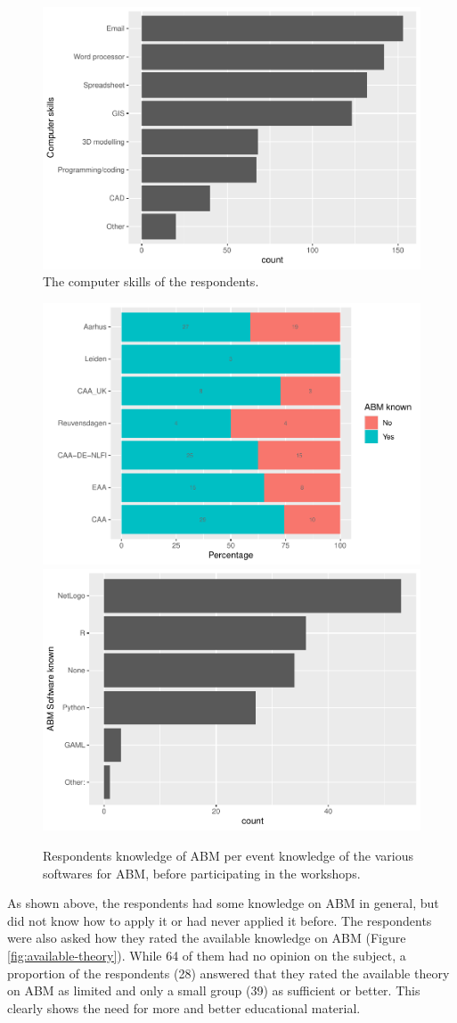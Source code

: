 \documentclass[
]{article}
\begin{document}
\begin{figure}
\includegraphics[width=0.5\linewidth]{paper_files/figure-latex/computer-skills-1} \caption{The computer skills of the respondents.}\label{fig:computer-skills}
\end{figure}

\begin{figure}
\includegraphics[width=0.5\linewidth]{paper_files/figure-latex/abm-knowledge-1} \includegraphics[width=0.5\linewidth]{paper_files/figure-latex/abm-knowledge-2} \caption{Respondents knowledge of ABM per event knowledge of the various softwares for ABM, before participating in the workshops.}\label{fig:abm-knowledge}
\end{figure}

As shown above, the respondents had some knowledge on ABM in general, but did not know how to apply it or had never applied it before. The respondents were also asked how they rated the available knowledge on ABM (Figure \ref{fig:available-theory}). While 64 of them had no opinion on the subject, a proportion of the respondents (28) answered that they rated the available theory on ABM as limited and only a small group (39) as sufficient or better. This clearly shows the need for more and better educational material.
\end{document}
